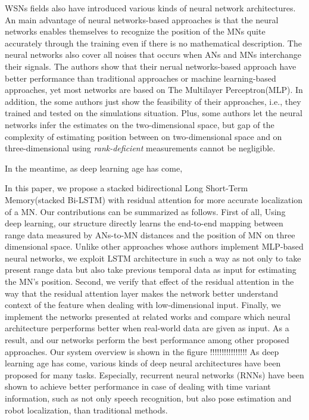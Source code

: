 \documentclass[letterpaper, 10 pt, conference]{ieeeconf}  %
\begin{document}
 WSNs fields also have introduced various kinds of neural network architectures\cite{rahman2009localization, singh2013tdoa, abdelhadi2013efficient, kumar2016localization, banihashemian2018new}. An main advantage of neural networks-based approaches is that the neural networks enables themselves to recognize the position of the MNs quite accurately through the training even if there is no mathematical description. The neural networks also cover all noises that occurs when ANs and MNs interchange their signals. The authors show that their nerual networks-based approach have better performance than traditional approaches or machine learning-based approaches, yet most networks are based on The Multilayer Perceptron(MLP). In addition, the some authors just show the feasibility of their approaches, i.e., they trained and tested on the simulations situation. Plus, some authors let the neural networks infer the estimates on the two-dimensional space, but gap of the complexity of estimating position between on two-dimensional space and on three-dimensional using \textit{rank-deficient} measurements cannot be negligible.


\cite{lim2018effective}

In the meantime, as deep learning age has come\cite{lecun2015deep},

In this paper, we propose a stacked bidirectional Long Short-Term Memory(stacked Bi-LSTM) with residual attention for more accurate localization of a MN. Our contributions can be summarized as follows. First of all, Using deep learning, our structure directly learns the end-to-end mapping between range data measured by ANs-to-MN distances and the position of MN on three dimensional space. Unlike other approaches whose authors implement MLP-based neural networks, we exploit LSTM architecture in such a way as not only to take present range data but also take previous temporal data as input for estimating the MN's position. Second, we verify that effect of the residual attention in the way that the residual attention layer makes the network better understand context of the feature when dealing with low-dimensional input. Finally, we implement the networks presented at related works and compare which neural architecture perperforms better when real-world data are given as input. As a result, and our networks perform the best performance among other proposed approaches. Our system overview is shown in the figure 
!!!!!!!!!!!!!!!!
 As deep learning age has come, various kinds of deep neural architectures have been proposed for many tasks. Especially, recurrent neural networks (RNNs) have been shown to achieve better performance in case of dealing with time variant information, such as not only speech recognition, but also pose estimation and robot localization, than traditional methods. 
 
\end{document}
